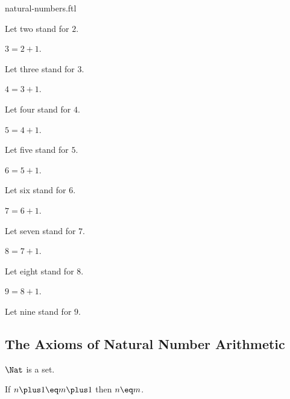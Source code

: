 \documentclass{naproche-library}
\begin{document}
\begin{smodule}{natural-numbers.ftl}
\begin{definition}[forthel,id=TwoSig]
    Let two stand for $2$.
  \end{definition}

  \begin{definition}[forthel,id=ThreeSig]
    $3=2\plus1$.

    Let three stand for $3$.
  \end{definition}

  \begin{definition}[forthel,id=FourSig]
    $4=3\plus1$.

    Let four stand for $4$.
  \end{definition}

  \begin{definition}[forthel,id=FiveSig]
    $5=4\plus1$.

    Let five stand for $5$.
  \end{definition}

  \begin{definition}[forthel,id=SixSig]
    $6=5\plus1$.

    Let six stand for $6$.
  \end{definition}

  \begin{definition}[forthel,id=SevenSig]
    $7=6\plus1$.

    Let seven stand for $7$.
  \end{definition}

  \begin{definition}[forthel,id=EightSig]
    $8=7\plus1$.

    Let eight stand for $8$.
  \end{definition}

  \begin{definition}[forthel,id=NineSig]
    $9=8\plus1$.

    Let nine stand for $9$.
  \end{definition}


  \subsection{The Axioms of Natural Number Arithmetic}

  \begin{axiom}[forthel,id=NatIsSetAx]
    $\Nat$ is a set.
  \end{axiom}

  \begin{axiom}[forthel,id=PlusIsInjectiveAx]
    If $n\plus1\eq m\plus1$ then $n\eq m$.
  \end{axiom}


\end{smodule}
\end{document}
